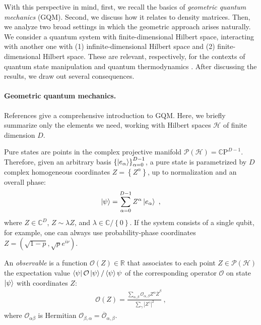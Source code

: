 \documentclass[draft,nofootinbib,pre,twocolumn,showpacs,showkeys,preprintnumbers,floatfix]{revtex4-1}
\newcommand{\1}{\mathbbm{1}}
\begin{document}

With this perspective in mind, first, we recall the basics of \emph{geometric quantum
mechanics} (GQM). Second, we discuss how it relates to density matrices. Then, we 
analyze two broad settings in which the geometric approach arises naturally.
We consider a quantum system with finite-dimensional Hilbert space, interacting with
another one with (1) infinite-dimensional Hilbert space and (2) finite-dimensional
Hilbert space. These are relevant, respectively, for the contexts of quantum state 
manipulation \cite{Anza20c} and quantum thermodynamics \cite{Anza20b}. After 
discussing the results, we draw out several consequences.

\paragraph*{Geometric quantum mechanics.}
\label{sec:GQM}
References
\cite{STROCCHI1966,Miel68,Kibble1979,Heslot1985,Page87,And90,Gibbons1992,Ashtekar1995,Ashtekar1999,Brody2001,Bengtsson2017,Carinena2007,Chruscinski2006,Marmo2010,Avron2020,Pastorello2015,Pastorello2015a,Pastorello2016,Clemente-Gallardo2013}
give a comprehensive introduction to GQM. Here, we briefly summarize only the
elements we need, working with Hilbert spaces $\mathcal{H}$ of finite dimension $D$.

Pure states are points in the complex projective manifold $\mathcal{P}\left(
\mathcal{H} \right)=\mathbb{C}\mathrm{P}^{D-1}$. Therefore, given an arbitrary
basis $\left\{\ket{e_\alpha} \right\}_{\alpha=0}^{D-1}$, a pure state is
parametrized by $D$ complex homogeneous coordinates $Z = \left\{      Z^\alpha\right\}$, up to
normalization and an overall phase:
\begin{align*}
\ket{\psi} = \sum_{\alpha=0}^{D-1} Z^\alpha \ket{e_\alpha}
  ~,
\end{align*}
where $Z \in \mathbb{C}^{D}$, $Z \sim \lambda Z$, and $\lambda \in
\mathbb{C}/\left\{ 0\right\}$. If the system consists of a single qubit, for
example, one can always use probability-phase coordinates $Z = (\sqrt{1-p},\sqrt{p} e^{i\nu})$.

An \emph{observable} is a function $\mathcal{O}(Z) \in
\mathbb{R}$ that associates to each point  $Z \in \mathcal{P}(\mathcal{H})$ the
expectation value $\bra{\psi} \mathcal{O} \ket{\psi}/\braket{\psi}{\psi}$ of the corresponding
operator $\mathcal{O}$ on state $\ket{\psi}$ with coordinates $Z$:
\begin{align}
\mathcal{O}(Z) = \frac{\sum_{\alpha,\beta} \mathcal{O}_{\alpha,\beta}Z^\alpha \overline{Z}^\beta}{\sum_{\gamma} \left\vert Z^\gamma\right\vert^2}
  ~,
\label{eq:GQM_Observable}
\end{align}
where $\mathcal{O}_{\alpha \beta}$ is Hermitian $\mathcal{O}_{\beta,\alpha} = \overline{\mathcal{O}}_{\alpha,\beta}$.
\end{document}
